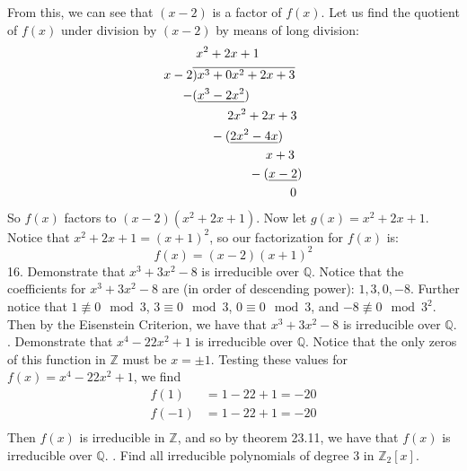 \documentclass{article}
\newcommand\showdiv[1]{\overline{\smash{)}#1}}
\begin{document}
From this, we can see that $(x - 2)$ is a factor of $f(x)$. Let us find the quotient of $f(x)$ under division by $(x - 2)$ by means of long division:
\begin{align*}
    &\; x^2 + 2x + 1\\
    x-2 &\showdiv{x^3 + 0x^2 + 2x + 3} \\
    -&(\underline{x^3 - 2x^2}) \\
    &\;\;\;\;\;\;\;\;\;\; 2x^2 + 2x + 3 \\
    &\;\;\;\;\;-(\underline{2x^2 - 4x}) \\
    &\;\;\;\;\;\;\;\;\;\;\;\;\;\;\;\;\;\;\;\;\; x + 3 \\
    &\;\;\;\;\;\;\;\;\;\;\;\;\;\;\;\; -(\underline{x - 2}) \\
    &\;\;\;\;\;\;\;\;\;\;\;\;\;\;\;\;\;\;\;\;\;\;\;\;\;\;\;\; 0 \\
\end{align*}
So $f(x)$ factors to $(x - 2)(x^2 + 2x + 1)$. Now let $g(x) = x^2 + 2x + 1$. Notice that $x^2 + 2x + 1 = (x + 1)^2$, so our factorization for $f(x)$ is:
\[f(x) = (x-2)(x+1)^2\]
16. Demonstrate that $x^3 + 3x^2 - 8$ is irreducible over $\mathbb{Q}$.
\newline\newline
Notice that the coefficients for $x^3 + 3x^2 - 8$ are (in order of descending power): $1, 3, 0, -8$. Further notice that $1 \not\equiv 0 \mod 3$, $3 \equiv 0 \mod 3$, $0 \equiv 0 \mod 3$, and $-8 \not\equiv 0 \mod 3^2$. Then by the Eisenstein Criterion, we have that $x^3 + 3x^2 - 8$ is irreducible over $\mathbb{Q}$.
\newline{}. Demonstrate that $x^4 - 22x^2 + 1$ is irreducible over $\mathbb{Q}$.
\newline\newline
Notice that the only zeros of this function in $\mathbb{Z}$ must be $x = \pm 1$. Testing these values for $f(x) = x^4 - 22x^2 + 1$, we find
\begin{align*}
    f(1) &= 1 - 22 + 1 = -20 \\
    f(-1) &= 1 - 22 + 1 = -20 \\
\end{align*}
Then $f(x)$ is irreducible in $\mathbb{Z}$, and so by theorem 23.11, we have that $f(x)$ is irreducible over $\mathbb{Q}$.
\newline{}. Find all irreducible polynomials of degree 3 in $\mathbb{Z}_2[x]$.
\newline\newline
\end{document}
